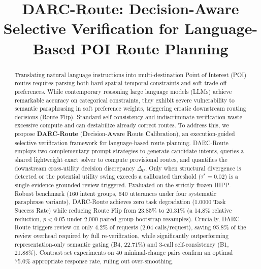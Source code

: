\documentclass[conference]{IEEEtran}
\begin{document}
\title{DARC-Route: Decision-Aware Selective Verification for Language-Based POI Route Planning}

\author{
}

\maketitle

\begin{abstract}
Translating natural language instructions into multi-destination Point of Interest (POI) routes requires parsing both hard spatial-temporal constraints and soft trade-off preferences. While contemporary reasoning large language models (LLMs) achieve remarkable accuracy on categorical constraints, they exhibit severe vulnerability to semantic paraphrasing in soft preference weights, triggering erratic downstream routing decisions (Route Flip). Standard self-consistency and indiscriminate verification waste excessive compute and can destabilize already correct routes. To address this, we propose \textbf{DARC-Route} (\textbf{D}ecision-\textbf{A}ware \textbf{R}oute \textbf{C}alibration), an execution-guided selective verification framework for language-based route planning. DARC-Route employs two complementary prompt strategies to generate candidate intents, queries a shared lightweight exact solver to compute provisional routes, and quantifies the downstream cross-utility decision discrepancy $\Delta_U$. Only when structural divergence is detected or the potential utility swing exceeds a calibrated threshold ($\tau^* = 0.02$) is a single evidence-grounded review triggered. Evaluated on the strictly frozen HIPP-Robust benchmark (160 intent groups, 640 utterances under four systematic paraphrase variants), DARC-Route achieves zero task degradation (1.0000 Task Success Rate) while reducing Route Flip from 23.85\% to 20.31\% (a 14.8\% relative reduction, $p < 0.05$ under 2,000 paired group bootstrap resamples). Crucially, DARC-Route triggers review on only 4.2\% of requests (2.04 calls/request), saving 95.8\% of the review overhead required by full re-verification, while significantly outperforming representation-only semantic gating (B4, 22.71\%) and 3-call self-consistency (B1, 21.88\%). Contrast set experiments on 40 minimal-change pairs confirm an optimal 75.0\% appropriate response rate, ruling out over-smoothing.
\end{abstract}
\end{document}
